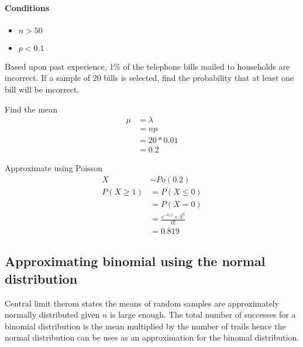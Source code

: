         \paragraph{Conditions}
        \begin{itemize}
            \item $n > 50$
            \item $p < 0.1$
        \end{itemize}

        \begin{example}
        {
        Based upon past experience, 1\% of the telephone bills mailed to households are incorrect. If a sample of 20 bills is selected, find the probability that at least one bill will be incorrect.
        }

        \begin{step}{Find the mean}
        \begin{align*}
        \mu &= \lambda\\
        &= np\\
        &= 20 * 0.01\\
        &= 0.2
        \end{align*}
        \end{step}

        \begin{step}{Approximate using Poisson}
        \begin{align*}
        X &\sim Po(0.2)\\
        P(X \geq 1) &= P(X \leq 0)\\
        &= P(X = 0)\\
        &= \frac{e^{-0.2} \times \lambda^0}{0!}\\
        &= 0.819
        \end{align*}
        \end{step}

        \end{example}

    \newpage
    \subsection{Approximating binomial using the normal distribution}
        Central limit therom states the means of random samples are approximately normally distributed given $n$ is large enough. The total number of successes for a binomial distribution is the mean multiplied by the number of trails hence the normal distribution can be uses as an approximation for the binomal distribution.

